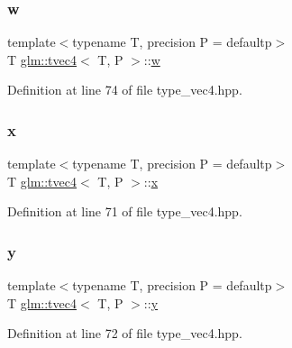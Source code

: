 \subsubsection{\texorpdfstring{w}{w}}
{\footnotesize\ttfamily template$<$typename T, precision P = defaultp$>$ \\
T \mbox{\hyperlink{structglm_1_1tvec4}{glm\+::tvec4}}$<$ T, P $>$\+::\mbox{\hyperlink{glad_8h_a1d0296e9e835f2e1ee17634af95fc1ec}{w}}}



Definition at line 74 of file type\+\_\+vec4.\+hpp.

\mbox{\label{structglm_1_1tvec4_a7998eea40494693ac46e2772fa20e6f2}} 
\subsubsection{\texorpdfstring{x}{x}}
{\footnotesize\ttfamily template$<$typename T, precision P = defaultp$>$ \\
T \mbox{\hyperlink{structglm_1_1tvec4}{glm\+::tvec4}}$<$ T, P $>$\+::\mbox{\hyperlink{glad_8h_a92d0386e5c19fb81ea88c9f99644ab1d}{x}}}



Definition at line 71 of file type\+\_\+vec4.\+hpp.

\mbox{\label{structglm_1_1tvec4_ac2e96cd66dfa6d44c4b0e0f15897500a}} 
\subsubsection{\texorpdfstring{y}{y}}
{\footnotesize\ttfamily template$<$typename T, precision P = defaultp$>$ \\
T \mbox{\hyperlink{structglm_1_1tvec4}{glm\+::tvec4}}$<$ T, P $>$\+::\mbox{\hyperlink{glad_8h_a66ddd433d2cacfe27f5906b7e86faeed}{y}}}



Definition at line 72 of file type\+\_\+vec4.\+hpp.

\mbox{\label{structglm_1_1tvec4_a137c815b36e9331209349644c61160a6}} 
